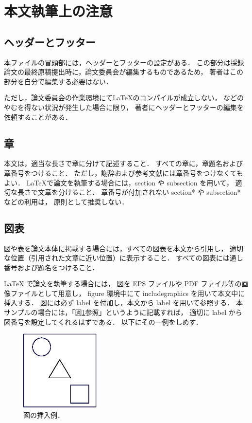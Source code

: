 
\section{本文執筆上の注意}

\subsection{ヘッダーとフッター}

本ファイルの冒頭部には，ヘッダーとフッターの設定がある．
この部分は採録論文の最終原稿提出時に，論文委員会が編集するものであるため，
著者はこの部分を自分で編集する必要はない．

ただし，論文委員会の作業環境にてLaTeXのコンパイルが成立しない，
などのやむを得ない状況が発生した場合に限り，
著者にヘッダーとフッターの編集を依頼することがある．

\subsection{章}

本文は，適当な長さで章に分けて記述すること．
すべての章に，章題名および章番号をつけること．
ただし，謝辞および参考文献には章番号をつけなくてもよい．
LaTeXで論文を執筆する場合には，section や subsection を用いて，
適切な長さで文章を分けること．
章番号が付加されない section* や subsection* などの利用は，
原則として推奨しない．

\subsection{図表}

図や表を論文本体に掲載する場合には，すべての図表を本文から引用し，
適切な位置（引用された文章に近い位置）に表示すること．
すべての図表には通し番号および題名をつけること．

LaTeX で論文を執筆する場合には，
図を EPS ファイルや PDF ファイル等の画像ファイルとして用意し，
figure 環境中にて includegraphics を用いて本文中に挿入する．
図には必ず label を付加し，本文から label を用いて参照する．
本サンプルの場合には，「図\ref{fig:sample}参照」というように記載すれば，
適切に label から図番号を設定してくれるはずである．
以下にその一例をしめす．

\begin{figure}[H]
 \centering
 \includegraphics[width=40mm]{fig-sample.eps}
 \caption{\small{図の挿入例．}}
 \label{fig:sample}
\end{figure}

